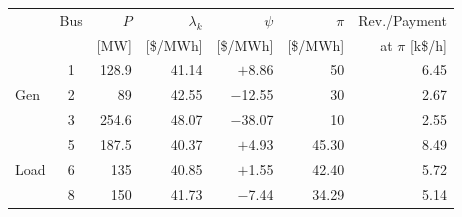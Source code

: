 \begin{table}[!tb]
\centering
\label{tab:prices_9bus}
\footnotesize
\setlength{\tabcolsep}{4pt}
\newcommand{\rowhl}[1]{\cellcolor{gray!25}#1}
\begin{tabular}{lcrrrrr}
\toprule
 & Bus & $P$ & $\lambda_k$ & $\psi$ & $\pi$ & Rev./Payment \\
 &  & [MW] & [\$/MWh] & [\$/MWh] & [\$/MWh] & at $\pi$ [k\$/h] \\
\midrule
\multirow{3}{*}{Gen} & \rowhl{1} & \rowhl{128.9} & \rowhl{41.14} & \rowhl{$+$8.86} & \rowhl{50} & \rowhl{6.45} \\
 & 2 & 89 & 42.55 & $-$12.55 & 30 & 2.67 \\
 & 3 & 254.6 & 48.07 & $-$38.07 & 10 & 2.55 \\
\midrule
\multirow{3}{*}{Load} & 5 & 187.5 & 40.37 & $+$4.93 & 45.30 & 8.49 \\
 & 6 & 135 & 40.85 & $+$1.55 & 42.40 & 5.72 \\
 & \rowhl{8} & \rowhl{150} & \rowhl{41.73} & \rowhl{$-$7.44} & \rowhl{34.29} & \rowhl{5.14} \\
\bottomrule
\end{tabular}
\end{table}
